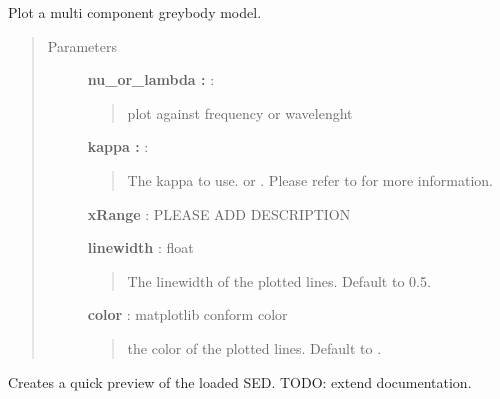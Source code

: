 \documentclass[a4paper,10pt,english]{sphinxmanual}
\begin{document}
\begin{fulllineitems}
\begin{fulllineitems}
\begin{description}
\end{description}



\end{fulllineitems}


\begin{fulllineitems}
\label{sed:astrolyze.sed.sed.Sed.plot_sed}
Plot a multi component greybody model.
\begin{quote}\begin{description}
\item[{Parameters }] \leavevmode
\textbf{nu\_or\_lambda :} :
\begin{quote}

plot against frequency  or wavelenght 
\end{quote}

\textbf{kappa :} :
\begin{quote}

The kappa to use.  or . Please refer
to  for more
information.
\end{quote}

\textbf{xRange} : PLEASE ADD DESCRIPTION

\textbf{linewidth} : float
\begin{quote}

The linewidth of the plotted lines. Default to 0.5.
\end{quote}

\textbf{color} : matplotlib conform color
\begin{quote}

the color of the plotted lines. Default to .
\end{quote}

\end{description}\end{quote}

\end{fulllineitems}


\begin{fulllineitems}
\label{sed:astrolyze.sed.sed.Sed.create_figure}
Creates a quick preview of the loaded SED. TODO: extend
documentation.

\end{fulllineitems}


\end{fulllineitems}
\end{document}
